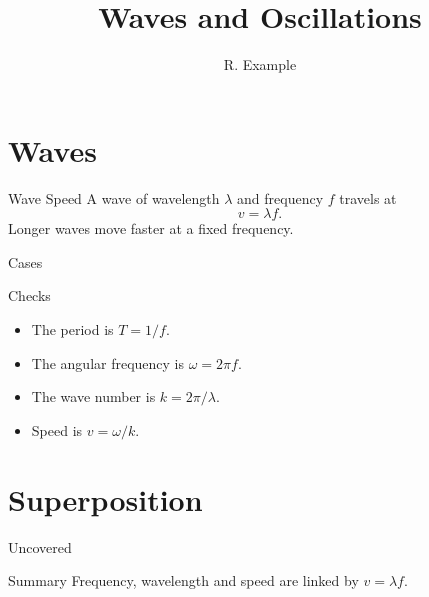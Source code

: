 \documentclass{beamer}
\title{Waves and Oscillations}
\author{R. Example}
\begin{document}
\section{Waves}
\begin{frame}{Wave Speed}
  A wave of wavelength $\lambda$ and frequency $f$ travels at
  \pause
  \begin{equation*}
    v = \lambda f.
  \end{equation*}
  \pause
  Longer waves move faster at a fixed frequency.
\end{frame}

\begin{frame}{Cases}
\end{frame}

\begin{frame}{Checks}
  \begin{itemize}
    \item<1-> The period is $T = 1/f$.
    \item<2-> The angular frequency is $\omega = 2\pi f$.
    \item<3-> The wave number is $k = 2\pi/\lambda$.
    \item<4-> Speed is $v = \omega/k$.
  \end{itemize}
\end{frame}

\section{Superposition}
\begin{frame}{Uncovered}


\end{frame}

\begin{frame}{Summary}
  Frequency, wavelength and speed are linked by $v = \lambda f$.
\end{frame}
\end{document}
